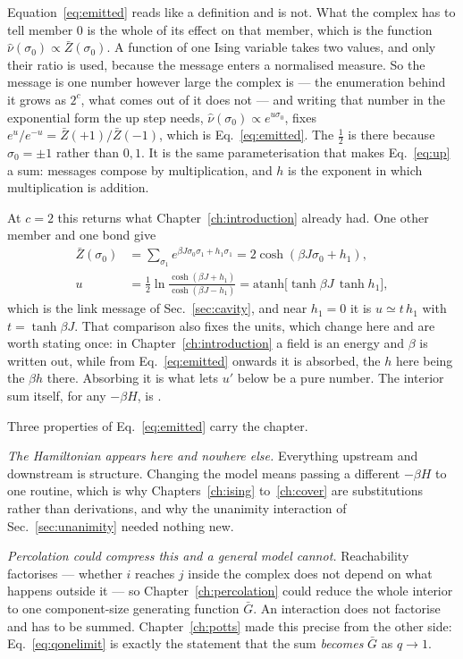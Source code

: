 Equation~\eqref{eq:emitted} reads like a definition and is not. What the complex
has to tell member $0$ is the whole of its effect on that member, which is the
function $\hat\nu(\sigma_{0})\propto \bar{Z}(\sigma_{0})$. A function of one Ising
variable takes two values, and only their ratio is used, because the message
enters a normalised measure. So the message is one number however large the
complex is --- the enumeration behind it grows as $2^{c}$, what comes out of it
does not --- and writing that number in the exponential form the up step needs,
$\hat\nu(\sigma_{0})\propto e^{u\sigma_{0}}$, fixes $e^{u}/e^{-u}=\bar{Z}(+1)/\bar{Z}(-1)$,
which is Eq.~\eqref{eq:emitted}. The $\tfrac12$ is there because
$\sigma_{0}=\pm1$ rather than $0,1$. It is the same parameterisation that makes
Eq.~\eqref{eq:up} a sum: messages compose by multiplication, and $h$ is the
exponent in which multiplication is addition.

At $c=2$ this returns what Chapter~\ref{ch:introduction} already had. One other
member and one bond give
\begin{align*}
  \bar{Z}(\sigma_{0})&=\sum_{\sigma_{1}}
    e^{\beta J\sigma_{0}\sigma_{1}+h_{1}\sigma_{1}}
    =2\cosh(\beta J\sigma_{0}+h_{1}),\\
  u&=\tfrac12\ln\frac{\cosh(\beta J+h_{1})}{\cosh(\beta J-h_{1})}
   =\mathrm{atanh}\bigl[\tanh\beta J\,\tanh h_{1}\bigr],
\end{align*}
which is the link message of Sec.~\ref{sec:cavity}, and near $h_{1}=0$ it is
$u\simeq t\,h_{1}$ with $t=\tanh\beta J$. That comparison also fixes the units,
which change here and are worth stating once: in Chapter~\ref{ch:introduction} a
field is an energy and $\beta$ is written out, while from
Eq.~\eqref{eq:emitted} onwards it is absorbed, the $h$ here being the $\beta h$
there. Absorbing it is what lets $u'$ below be a pure number. The interior sum
itself, for any $-\beta H$, is .

Three properties of Eq.~\eqref{eq:emitted} carry the chapter.

\emph{The Hamiltonian appears here and nowhere else.} Everything upstream and
downstream is structure. Changing the model means passing a different
$-\beta H$ to one routine, which is why Chapters~\ref{ch:ising}
to~\ref{ch:cover} are substitutions rather than derivations, and why the
unanimity interaction of Sec.~\ref{sec:unanimity} needed nothing new.

\emph{Percolation could compress this and a general model cannot.} Reachability
factorises --- whether $i$ reaches $j$ inside the complex does not depend on
what happens outside it --- so Chapter~\ref{ch:percolation} could reduce the
whole interior to one component-size generating function $\bar G$. An
interaction does not factorise and has to be summed. Chapter~\ref{ch:potts}
made this precise from the other side: Eq.~\eqref{eq:qonelimit} is exactly the
statement that the sum \emph{becomes} $\bar G$ as $q\to1$.

